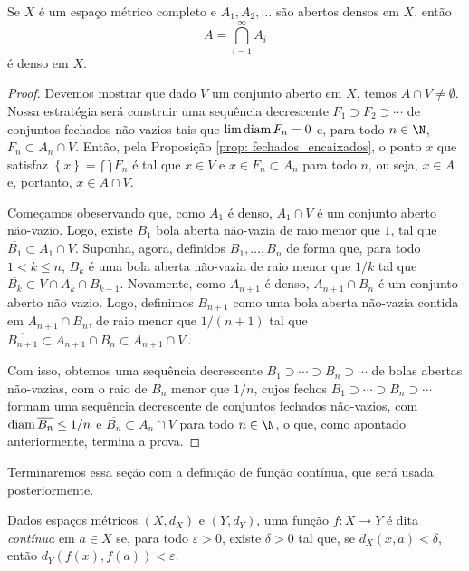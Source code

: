 \begin{teo}
    Se \( X \) é um espaço métrico completo e \( A_{ 1 }, A_{ 2 }, \dots \) são abertos densos em \( X \), então \[
        A = \bigcap_{ i=1 }^{ \infty } A_{ i }
    \]
    é denso em \( X \).
\end{teo}

\begin{proof}
    Devemos mostrar que dado \( V \) um conjunto aberto em \( X \), temos \( A \cap V \neq \emptyset \).
    Nossa estratégia será construir uma sequência decrescente \( F_{ 1 } \supset F_{ 2 } \supset \cdots \) de conjuntos fechados não-vazios tais que \( \lim \operatorname{diam} F_{ n } = 0 \) e, para todo \( n \in \N \), \( F_{ n } \subset A_{ n } \cap V \).
    Então, pela Proposição \ref{prop: fechados_encaixados}, o ponto \( x \) que satisfaz \( \left\{ x \right\} = \bigcap F_{ n } \) é tal que \( x \in V \) e \( x \in F_{ n } \subset A_{ n } \) para todo \( n \), ou seja, \( x \in A \) e, portanto, \( x \in A \cap V \).

    Começamos obeservando que, como \( A_{ 1 } \) é denso, \( A_{ 1 } \cap V \) é um conjunto aberto não-vazio.
    Logo, existe \( B_{ 1 } \) bola aberta não-vazia de raio menor que \( 1 \), tal que \( \overline{B_{ 1 }} \subset A_{ 1 } \cap V \).
    Suponha, agora, definidos \( B_{ 1 }, \dots, B_{ n } \) de forma que, para todo \( 1 < k \leq n \), \( B_{ k } \) é uma bola aberta não-vazia de raio menor que \( 1/k \) tal que \( \overline{B_{ k }} \subset V \cap A_{ k } \cap B_{ k-1 } \).
    Novamente, como \( A_{ n+1 } \) é denso, \( A_{ n+1 } \cap B_{ n } \) é um conjunto aberto não vazio.
    Logo, definimos \( B_{ n+1 } \) como uma bola aberta não-vazia contida em \( A_{ n+1 } \cap B_{ n } \), de raio menor que \( 1/( n+1 ) \) tal que \( \overline{B_{ n+1 }} \subset A_{ n+1 } \cap B_{ n } \subset A_{ n+1 } \cap V \ \).

    Com isso, obtemos uma sequência decrescente \( B_{ 1 } \supset \cdots \supset B_{ n } \supset \cdots \) de bolas abertas não-vazias, com o raio de \( B_{ n } \) menor que \( 1/n \), cujos fechos \( \overline{B_{ 1 }} \supset \cdots \supset \overline{B_{ n }} \supset \cdots \) formam uma sequência decrescente de conjuntos fechados não-vazios, com \( \operatorname{diam} \overline{B_{ n }} \leq 1/n \) e \( \overline{B_{ n }} \subset A_{ n } \cap V \) para todo \( n \in \N \), o que, como apontado anteriormente, termina a prova.
\end{proof}

Terminaremos essa seção com a definição de função contínua, que será usada posteriormente.

\begin{defn}
    Dados espaços métricos \( (X, d_{ X }) \) e \( (Y, d_{ Y }) \), uma função \( f : X \to Y \) é dita \emph{contínua} em \( a \in X \) se, para todo \( \varepsilon > 0 \), existe \( \delta > 0 \) tal que, se \( d_{ X }(x, a) < \delta \), então \( d_{ Y }(f(x), f(a)) < \varepsilon \).
\end{defn}
